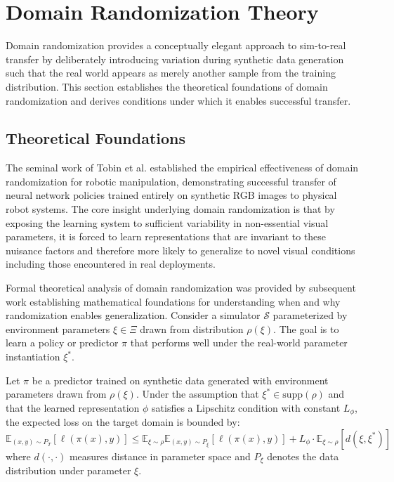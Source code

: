 \section{Domain Randomization Theory}
\label{sec:dr_theory}

Domain randomization provides a conceptually elegant approach to sim-to-real transfer by deliberately introducing variation during synthetic data generation such that the real world appears as merely another sample from the training distribution. This section establishes the theoretical foundations of domain randomization and derives conditions under which it enables successful transfer.

\subsection{Theoretical Foundations}

The seminal work of Tobin et al. established the empirical effectiveness of domain randomization for robotic manipulation, demonstrating successful transfer of neural network policies trained entirely on synthetic RGB images to physical robot systems. The core insight underlying domain randomization is that by exposing the learning system to sufficient variability in non-essential visual parameters, it is forced to learn representations that are invariant to these nuisance factors and therefore more likely to generalize to novel visual conditions including those encountered in real deployments.

Formal theoretical analysis of domain randomization was provided by subsequent work establishing mathematical foundations for understanding when and why randomization enables generalization. Consider a simulator $\mathcal{S}$ parameterized by environment parameters $\xi \in \Xi$ drawn from distribution $\rho(\xi)$. The goal is to learn a policy or predictor $\pi$ that performs well under the real-world parameter instantiation $\xi^*$.

\begin{theorem}
\label{thm:dr_transfer}
Let $\pi$ be a predictor trained on synthetic data generated with environment parameters drawn from $\rho(\xi)$. Under the assumption that $\xi^* \in \text{supp}(\rho)$ and that the learned representation $\phi$ satisfies a Lipschitz condition with constant $L_\phi$, the expected loss on the target domain is bounded by:
\begin{equation}
\mathbb{E}_{(x,y) \sim P_T}[\ell(\pi(x), y)] \leq \mathbb{E}_{\xi \sim \rho}\mathbb{E}_{(x,y) \sim P_\xi}[\ell(\pi(x), y)] + L_\phi \cdot \mathbb{E}_{\xi \sim \rho}[d(\xi, \xi^*)]
\end{equation}
where $d(\cdot, \cdot)$ measures distance in parameter space and $P_\xi$ denotes the data distribution under parameter $\xi$.
\end{theorem}

